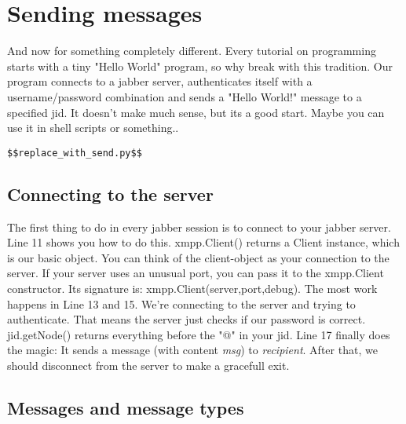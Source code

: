 \section{Sending messages}

And now for something completely different.
Every tutorial on programming starts with a tiny "Hello World" program, so why break with this tradition.
Our program connects to a jabber server, authenticates itself with a username/password combination and sends a "Hello
World!" message to a specified jid. It doesn't make much sense, but its a good start. Maybe you can use it  in shell scripts or something..

\begin{verbatim}
$$replace_with_send.py$$
\end{verbatim}
\newpage
\subsection{Connecting to the server}
The first thing to do in every jabber session is to connect to your jabber server.
Line 11 shows you how to do this. xmpp.Client() returns a Client instance, which is our basic object.
You can think of the client-object as your connection to the server. If your server uses an unusual port, you can pass it to the xmpp.Client constructor. Its signature is: xmpp.Client(server,port,debug).
\newline
\newline
The most work happens in Line 13 and 15. We're connecting to the server and trying to authenticate. That means the server just checks if our password is correct. jid.getNode() returns everything before the "@" in your jid.
\newline
\newline
Line 17 finally does the magic: It sends a message (with content \textit{msg}) to \textit{recipient}.
After that, we should disconnect from the server to make a gracefull exit.

\subsection{Messages and message types}

